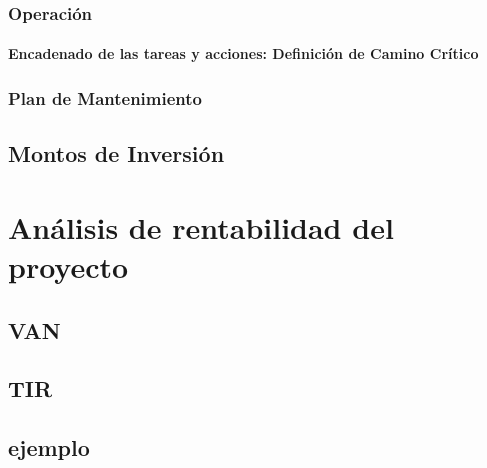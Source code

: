 \documentclass[10pt,a4paper]{report}
\begin{document}
\subsection{Operación}

\subsubsection{Encadenado de las tareas y acciones: Definición de Camino Crítico}

\subsection{Plan de Mantenimiento}

\section{Montos de Inversión}



\chapter{Análisis de rentabilidad del proyecto}

\section{VAN}

\section{TIR}

\section{ejemplo}
\end{document}
